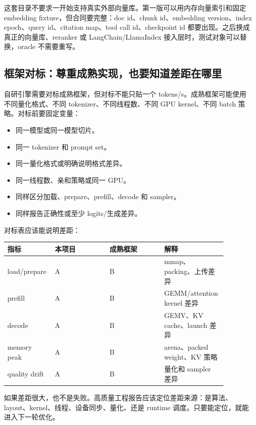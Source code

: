 这套目录不要求一开始支持真实外部向量库。第一版可以用内存向量索引和固定 embedding fixture，但合同要完整：doc id、chunk id、embedding version、index epoch、query id、citation map、tool call id、checkpoint id 都要出现。之后换成真正的向量库、reranker 或 LangChain/LlamaIndex 接入层时，测试对象可以替换，oracle 不需要重写。

\subsection{框架对标：尊重成熟实现，也要知道差距在哪里}

自研引擎需要对标成熟框架，但对标不能只贴一个 tokens/s。成熟框架可能使用不同量化格式、不同 tokenizer、不同线程数、不同 GPU kernel、不同 batch 策略。对标前要固定变量：

\begin{itemize}
  \item 同一模型或同一模型切片。
  \item 同一 tokenizer 和 prompt set。
  \item 同一量化格式或明确说明格式差异。
  \item 同一线程数、亲和策略或同一 GPU。
  \item 同样区分加载、prepare、prefill、decode 和 sampler。
  \item 同样报告正确性或至少 logits/生成差异。
\end{itemize}

对标表应该能说明差距：

\begin{center}
\begin{tabular}{p{0.20\linewidth}p{0.24\linewidth}p{0.24\linewidth}p{0.20\linewidth}}
\toprule
指标 & 本项目 & 成熟框架 & 解释 \\
\midrule
load/prepare & A & B & mmap、packing、上传差异 \\
prefill & A & B & GEMM/attention kernel 差异 \\
decode & A & B & GEMV、KV cache、launch 差异 \\
memory peak & A & B & arena、packed weight、KV 策略 \\
quality drift & A & B & 量化和 sampler 差异 \\
\bottomrule
\end{tabular}
\end{center}

如果差距很大，也不是失败。高质量工程报告应该定位差距来源：是算法、layout、kernel、线程、设备同步、量化、还是 runtime 调度。只要能定位，就能进入下一轮优化。

